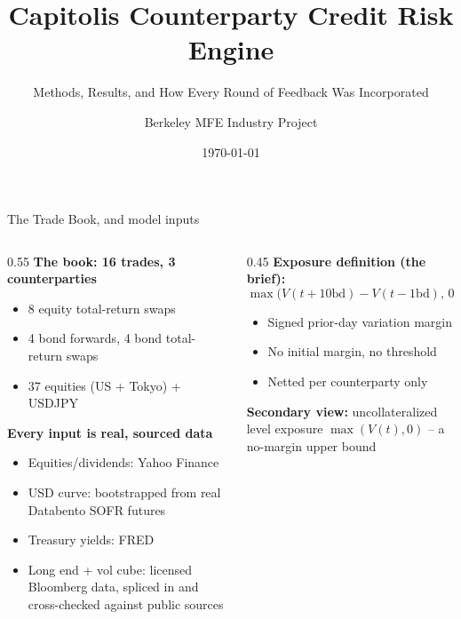 \documentclass[9pt,aspectratio=169]{beamer}
\title{\textbf{Capitolis Counterparty Credit Risk Engine}}
\subtitle{Methods, Results, and How Every Round of Feedback Was Incorporated}
\author{Berkeley MFE Industry Project}
\date{\today}
\begin{document}
\begin{frame}
  \titlepage
\end{frame}

\begin{frame}{The Trade Book, and model inputs}
  \begin{columns}[T]
    \begin{column}{0.55\textwidth}
      \textbf{The book: 16 trades, 3 counterparties}
      \begin{itemize}
        \item 8 equity total-return swaps
        \item 4 bond forwards, 4 bond total-return swaps
        \item 37 equities (US + Tokyo) + USDJPY
      \end{itemize}
      \vspace{6pt}
      \textbf{Every input is real, sourced data}
      \begin{itemize}
        \item Equities/dividends: Yahoo Finance
        \item USD curve: bootstrapped from real Databento SOFR futures
        \item Treasury yields: FRED
        \item Long end + vol cube: licensed Bloomberg data, spliced in and cross-checked against public sources
      \end{itemize}
    \end{column}
    \begin{column}{0.45\textwidth}
      \textbf{Exposure definition (the brief):}
      \[ \max\big(V(t{+}10\text{bd}) - V(t{-}1\text{bd}),\,0\big) \]
      \begin{itemize}
        \item Signed prior-day variation margin
        \item No initial margin, no threshold
        \item Netted per counterparty only
      \end{itemize}
      \vspace{8pt}
      \textbf{Secondary view:} uncollateralized level exposure $\max(V(t),0)$ -- a no-margin upper bound
    \end{column}
  \end{columns}
\end{frame}
\end{document}
